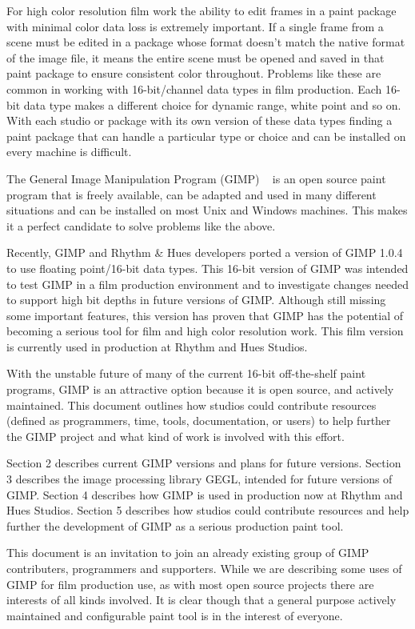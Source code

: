 
For high color resolution film work the ability to edit frames in a paint
package with minimal color data loss is extremely important. If a single frame
from a scene must be edited in a package whose format doesn't match the native
format of the image file, it means the entire scene must be opened and saved in
that paint package to ensure consistent color throughout.  Problems like these
are common in working with 16-bit/channel data types in film production. Each
16-bit data type makes a different choice for dynamic range, white point and so
on. With each studio or package with its own version of these data types
finding a paint package that can handle a particular type or choice and can be
installed on every machine is difficult.

The General Image Manipulation Program (GIMP) ~\cite{http://www.gimp.org} is an
open source paint program that is freely available, can be adapted and used in
many different situations and can be installed on most Unix and Windows
machines. This makes it a perfect candidate to solve problems like the above.

Recently, GIMP and Rhythm \& Hues developers ported a version of GIMP 1.0.4 to
use floating point/16-bit data types. This 16-bit version of GIMP was intended
to test GIMP in a film production environment and to investigate changes
needed to support high bit depths in future versions of GIMP. Although still
missing some important features, this version has proven that GIMP has the
potential of becoming a serious tool for film and high color resolution work.
This film version is currently used in production at Rhythm and Hues Studios.

With the unstable future of many of the current 16-bit off-the-shelf paint
programs, GIMP is an attractive option because it is open source, and actively
maintained. This document outlines how studios could contribute resources
(defined as programmers, time, tools, documentation, or users) to help further
the GIMP project and what kind of work is involved with this effort.

Section 2 describes current GIMP versions and plans for future versions.
Section 3 describes the image processing library GEGL, intended for future
versions of GIMP. Section 4 describes how GIMP is used in production now at
Rhythm and Hues Studios. Section 5 describes how studios could contribute
resources and help further the development of GIMP as a serious production
paint tool.

This document is an invitation to join an already existing group of GIMP
contributers, programmers and supporters. While we are describing some uses of
GIMP for film production use, as with most open source projects there are
interests of all kinds involved. It is clear though that a general purpose
actively maintained and configurable paint tool is in the interest of everyone.
